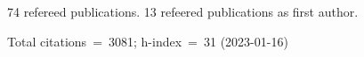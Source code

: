 74 refereed publications. 13 refeered publications as first author.

Total citations~=~3081; h-index~=~31 (2023-01-16)